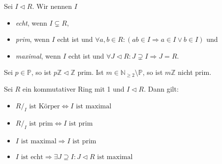 \begin{definition}
    Sei $I \vartriangleleft R$. Wir nennen $I$
    
    \begin{itemize}
        \item \emph{echt}, wenn $I \subsetneq R$, 
        \item \emph{prim}, wenn $I$ echt ist und
        $ \forall a, b \in R: (ab \in I \Rightarrow a \in I \lor b \in I) $ und
        \item\emph{maximal}, wenn $I$ echt ist und
        $\forall J \vartriangleleft R : J \supsetneq I \Rightarrow J = R. $
    \end{itemize}
\end{definition}

\begin{example}
    Sei $p \in \mathbb{P}$, so ist $p \mathbb{Z} \vartriangleleft \mathbb{Z}$ prim. Ist $m \in \mathbb{N}_{\geq 2} \setminus \mathbb{P}$, so ist $m \mathbb{Z}$ nicht prim.
\end{example}

\begin{proposition}
    Sei $R$ ein kommutativer Ring mit 1 und $I \vartriangleleft R$. Dann gilt:
    \begin{itemize}
        \item $R /_{I} \text{ ist Körper} \Leftrightarrow I \text{ ist maximal}$
        \item $R /_{I} \text{ ist prim} \Leftrightarrow I \text{ ist prim}$
        \item $I \text{ ist maximal} \Rightarrow I \text{ ist prim}$
        \item $I \text{ ist echt} \Rightarrow \exists J \supseteq I: J \vartriangleleft R \text{ ist maximal}$
    \end{itemize}
\end{proposition}

